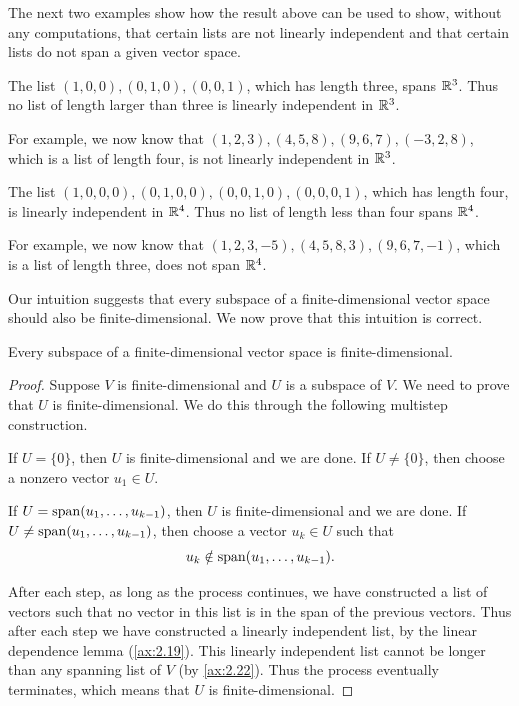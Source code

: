 The next two examples show how the result above can be used to show, without
any computations, that certain lists are not linearly independent and that
certain lists do not span a given vector space.

\begin{example}\label{ax:2.23}
The list $(1,0,0),(0,1,0),(0,0,1)$, which has length three, spans $\mathbb{R}^3$. Thus
no list of length larger than three is linearly independent in $\mathbb{R}^3$.

For example, we now know that $(1,2,3),(4,5,8),(9,6,7),(-3,2,8)$, which is a
list of length four, is not linearly independent in $\mathbb{R}^3$.
\end{example}

\begin{example}\label{ax:2.24}
The list $(1,0,0,0),(0,1,0,0),(0,0,1,0),(0,0,0,1)$, which has length four, is
linearly independent in $\mathbb{R}^4$. Thus no list of length less than four spans
$\mathbb{R}^4$.

For example, we now know that $(1,2,3,-5),(4,5,8,3),(9,6,7,-1)$, which is a
list of length three, does not span $\mathbb{R}^4$.
\end{example}

Our intuition suggests that every subspace of a finite-dimensional vector space
should also be finite-dimensional. We now prove that this intuition is
correct.

\begin{result}\label{ax:2.25}
Every subspace of a finite-dimensional vector space is finite-dimensional.
\end{result}

\begin{proof}
Suppose $V$ is finite-dimensional and $U$ is a subspace of $V$. We need to
prove that $U$ is finite-dimensional. We do this through the following
multistep construction.
\begin{description}[style=nextline,leftmargin=1em,itemsep=2pt,parsep=3pt]
\item[Step 1] If $U=\{0\}$, then $U$ is finite-dimensional and we are done. If
  $U\ne\{0\}$, then choose a nonzero vector $u_1\in U$.
\item[Step $\bm{k}$] If $U=\operatorname{span}(u_1,\dots,u_{k-1})$, then $U$ is
  finite-dimensional and we are done. If $U\ne\operatorname{span}(u_1,\dots,u_{k-1})$, then
  choose a vector $u_k\in U$ such that
  \[ u_k\notin\operatorname{span}(u_1,\dots,u_{k-1}). \]
\end{description}

After each step, as long as the process continues, we have constructed a list
of vectors such that no vector in this list is in the span of the previous
vectors. Thus after each step we have constructed a linearly independent list,
by the linear dependence lemma (\ref{ax:2.19}). This linearly independent list
cannot be longer than any spanning list of $V$ (by \ref{ax:2.22}). Thus the
process eventually terminates, which means that $U$ is finite-dimensional.
\end{proof}

